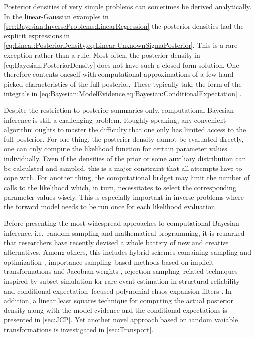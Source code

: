 Posterior densities of very simple problems can sometimes be derived analytically.
In the linear-Gaussian examples in \cref{sec:Bayesian:InverseProblems:LinearRegression}
the posterior densities had the explicit expressions in \cref{eq:Linear:PosteriorDensity,eq:Linear:UnknownSigmaPosterior}.
This is a rare exception rather than a rule.
Most often, the posterior density in \cref{eq:Bayesian:PosteriorDensity} does not have such a closed-form solution.
One therefore contents oneself with computational approximations of a few hand-picked characteristics of the full posterior.
These typically take the form of the integrals in \cref{eq:Bayesian:ModelEvidence,eq:Bayesian:ConditionalExpectation} \cite{MCMC:Evans2000,MCMC:Chen2000}.
\par %
Despite the restriction to posterior summaries only, computational Bayesian inference is still a challenging problem.
Roughly speaking, any convenient algorithm oughts to master the difficulty that one only has limited access to the full posterior.
For one thing, the posterior density cannot be evaluated directly, one can only compute the likelihood function for certain parameter values individually.
Even if the densities of the prior or some auxiliary distribution can be calculated and sampled, this is a major constraint that all attempts have to cope with.
For another thing, the computational budget may limit the number of calls to the likelihood which, in turn, necessitates to select the corresponding parameter values wisely.
This is especially important in inverse problems where the forward model needs to be run once for each likelihood evaluation.
\par %
Before presenting the most widespread approaches to computational Bayesian inference, i.e.\ random sampling and mathematical programming,
it is remarked that researchers have recently devised a whole battery of new and creative alternatives.
Among others, this includes hybrid schemes combining sampling and optimization \cite{Bayesian:Bardsley2014,Bayesian:Bardsley2015},
importance sampling--based methods based on implicit transformations and Jacobian weights \cite{Bayesian:Chorin2009,Bayesian:Morzfeld2010,Bayesian:Chorin2012,Bayesian:Morzfeld2015},
rejection sampling--related techniques inspired by subset simulation for rare event estimation in structural reliability \cite{Bayesian:Betz2014,Bayesian:Straub2015,Bayesian:DiazDelaO2017}
and conditional expectation--focused polynomial chaos expansion filters \cite{Bayesian:Rosic2012,Bayesian:Rosic2013:a,Bayesian:Matthies2016:a,Bayesian:Matthies2016:b}.
In addition, a linear least squares technique for computing the actual posterior density along with the model evidence and the conditional expectations is presented in \cref{sec:JCP}.
Yet another novel approach based on random variable transformations is investigated in \cref{sec:Transport}.

